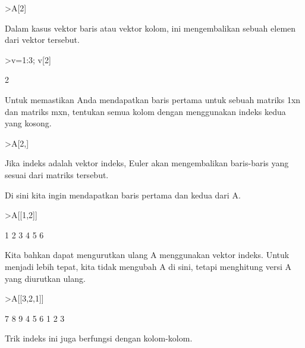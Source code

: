 \documentclass[12pt,arial,letterpaper]{book}
\begin{document}
\begin{eulercomment}
\begin{eulercomment}
\begin{eulercomment}
\begin{eulercomment}
\begin{eulercomment}
\begin{eulercomment}
\begin{eulercomment}
\begin{eulercomment}
\begin{eulercomment}
\end{eulercomment}
\begin{eulerprompt}
>A[2]
\end{eulerprompt}
\begin{euleroutput}
  [4,  5,  6]
\end{euleroutput}
\begin{eulercomment}
Dalam kasus vektor baris atau vektor kolom, ini mengembalikan sebuah
elemen dari vektor tersebut.
\end{eulercomment}
\begin{eulerprompt}
>v=1:3; v[2]
\end{eulerprompt}
\begin{euleroutput}
  2
\end{euleroutput}
\begin{eulercomment}
Untuk memastikan Anda mendapatkan baris pertama untuk sebuah matriks
1xn dan matriks mxn, tentukan semua kolom dengan menggunakan indeks
kedua yang kosong.
\end{eulercomment}
\begin{eulerprompt}
>A[2,]
\end{eulerprompt}
\begin{euleroutput}
  [4,  5,  6]
\end{euleroutput}
\begin{eulercomment}
Jika indeks adalah vektor indeks, Euler akan mengembalikan baris-baris
yang sesuai dari matriks tersebut.

Di sini kita ingin mendapatkan baris pertama dan kedua dari A.
\end{eulercomment}
\begin{eulerprompt}
>A[[1,2]]
\end{eulerprompt}
\begin{euleroutput}
              1             2             3 
              4             5             6 
\end{euleroutput}
\begin{eulercomment}
Kita bahkan dapat mengurutkan ulang A menggunakan vektor indeks. Untuk
menjadi lebih tepat, kita tidak mengubah A di sini, tetapi menghitung
versi A yang diurutkan ulang.
\end{eulercomment}
\begin{eulerprompt}
>A[[3,2,1]]
\end{eulerprompt}
\begin{euleroutput}
              7             8             9 
              4             5             6 
              1             2             3 
\end{euleroutput}
\begin{eulercomment}
Trik indeks ini juga berfungsi dengan kolom-kolom.


\end{eulercomment}
\end{eulercomment}
\end{eulercomment}
\end{eulercomment}
\end{eulercomment}
\end{eulercomment}
\end{eulercomment}
\end{eulercomment}
\end{eulercomment}
\end{document}
